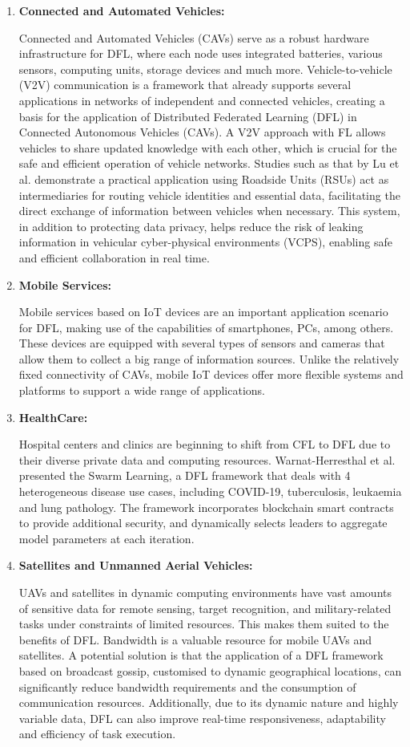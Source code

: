 \begin{enumerate}
	\item \textbf{Connected and Automated Vehicles:}
	
	Connected and Automated Vehicles (CAVs) serve as a robust hardware infrastructure for DFL, where each node uses integrated batteries, various sensors, computing units, storage devices and much more. Vehicle-to-vehicle (V2V) communication is a framework that already supports several applications in networks of independent and connected vehicles, creating a basis for the application of Distributed Federated Learning (DFL) in Connected Autonomous Vehicles (CAVs). A V2V approach with FL allows vehicles to share updated knowledge with each other, which is crucial for the safe and efficient operation of vehicle networks. Studies such as that by Lu et al. demonstrate a practical application using Roadside Units (RSUs) act as intermediaries for routing vehicle identities and essential data, facilitating the direct exchange of information between vehicles when necessary. This system, in addition to protecting data privacy, helps reduce the risk of leaking information in vehicular cyber-physical environments (VCPS), enabling safe and efficient collaboration in real time.
	\item \textbf{Mobile Services:}
	
	Mobile services based on IoT devices are an important application scenario for \gls{DFL}, making use of the capabilities of smartphones, PCs, among others. These devices are equipped with several types of sensors and cameras that allow them to collect a big range of information sources. Unlike the relatively fixed connectivity of CAVs, mobile IoT devices offer more flexible systems and platforms to support a wide range of applications.
	\item \textbf{HealthCare:}
	
	Hospital centers and clinics are beginning to shift from \gls{CFL} to \gls{DFL} due to their diverse private data and computing resources. Warnat-Herresthal et al. presented the Swarm Learning, a \gls{DFL} framework that deals with 4 heterogeneous disease use cases, including COVID-19, tuberculosis, leukaemia and lung pathology. The framework incorporates blockchain smart contracts to provide additional security, and dynamically selects leaders to aggregate model parameters at each iteration.
	\item \textbf{Satellites and Unmanned Aerial Vehicles:}
	
	UAVs and satellites in dynamic computing environments have vast amounts of sensitive data for remote sensing, target recognition, and military-related tasks under constraints of limited resources. This makes them suited to the benefits of DFL. Bandwidth is a valuable resource for mobile UAVs and satellites. A potential solution is that the application of a \gls{DFL} framework based on broadcast gossip, customised to dynamic geographical locations, can significantly reduce bandwidth requirements and the consumption of communication resources. Additionally, due to its dynamic nature and highly variable data, \gls{DFL} can also improve real-time responsiveness, adaptability and efficiency of task execution.


\end{enumerate}
